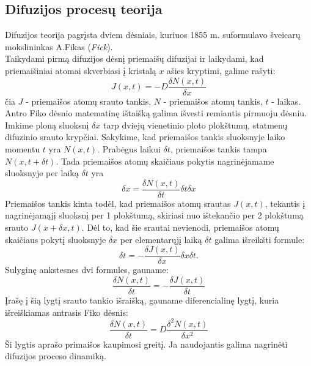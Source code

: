 \documentclass[11pt,a4paper]{article}
\begin{document}
\subsection{Difuzijos procesų teorija}
Difuzijos teorija pagrįsta dviem dėsniais, kuriuos 1855 m. suformulavo šveicarų mokslininkas A.Fikas (\emph{Fick}).\\
Taikydami pirmą difuzijos dėsnį priemaišų difuzijai ir laikydami, kad priemaišiniai atomai skverbiasi į kristalą $x$ ašies kryptimi, galime rašyti:
\begin{equation} 
  J(x,t) = - D \frac{\delta N(x,t)}{\delta x}
\end{equation}
čia $J$ - priemaišos atomų srauto tankis, $N$ - priemaišos atomų tankis, $t$ - laikas.\\
Antro Fiko dėsnio matematinę ištaišką galima išvesti remiantis pirmuoju dėsniu.\\
Imkime ploną sluoksnį $\delta x$ tarp dviejų vienetinio ploto plokštumų, statmenų difuzinio srauto krypčiai. 
Sakykime, kad priemaišos tankis sluoksnyje laiko momentu $t$ yra $N(x,t)$. Prabėgus laikui $\delta t$, 
priemaišos tankis tampa $N(x,t+ \delta t)$. Tada priemaišos atomų skaičiaus pokytis nagrinėjamame sluoksnyje per laiką $\delta t$ yra
\begin{equation}
[ N (x,t+\delta t ) - N(x,t) ] \delta x = \frac{\delta N(x,t)}{\delta t} \delta t \delta x
\end{equation}
Priemaišos tankis kinta todėl, kad priemaišos atomų srautas $J(x,t)$, tekantis į nagrinėjamąjį sluoksnį per 1 plokštumą, 
skiriasi nuo ištekančio per 2 plokštumą srauto $J(x+\delta x,t)$. Dėl to, kad šie srautai nevienodi, 
priemaišos atomų skaičiaus pokytį sluoksnyje $\delta x$ per elementarųjį laiką $\delta t$ galima išreikšti formule:
\begin{equation}
 [J(x,t) - J(x + \delta x,t ) ] \delta t = - \frac{\delta J(x,t)}{\delta x} \delta x \delta t. 
\end{equation}
Sulyginę ankstesnes dvi formules, gauname:
\begin{equation}
\frac{\delta N(x,t)}{\delta t} = - \frac{\delta J(x,t)}{\delta t} 
\end{equation}
Įrašę į šią lygtį srauto tankio išraišką, gauname diferencialinę lygtį, kuria išreiškiamas antrasis Fiko dėsnis:
\begin{equation}
\frac{\delta N(x,t)}{\delta t} = D \frac{\delta^2 N(x,t)}{\delta x^2} 
\end{equation}
Ši lygtis aprašo primaišos kaupimosi greitį. Ja naudojantis galima nagrinėti difuzijos proceso dinamiką.\\
\end{document}
